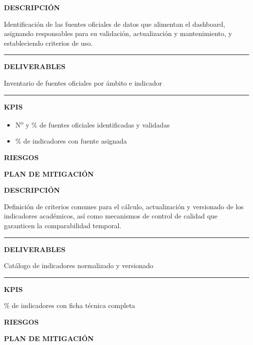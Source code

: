\documentclass[11pt,a4paper]{scrreprt}
\newcommand{\fieldlabel}[1]{%
  {\footnotesize\sffamily\bfseries\color{mutedcolor}\MakeUppercase{#1}}\par\nopagebreak[4]
}
\newcommand{\fieldsep}{\vspace{3pt}\noindent\textcolor{bordercolor}{\rule{\linewidth}{0.4pt}}\vspace{3pt}\par}
\begin{document}
\begin{tcolorbox}[pabox={dashcolor}{PA3.1 \enspace\textbullet\enspace Identificación y validación de fuentes oficiales de datos}]

\fieldlabel{Descripci\'on}
{\small Identificación de las fuentes oficiales de datos que alimentan el dashboard, asignando responsables para su validación, actualización y mantenimiento, y estableciendo criterios de uso.}\par
\fieldsep
\fieldlabel{Deliverables}
{\small Inventario de fuentes oficiales por ámbito e indicador}\par
\fieldsep
\fieldlabel{KPIs}
{\small \begin{itemize}[noitemsep,topsep=2pt]
\item N\textsuperscript{o} y \% de fuentes oficiales identificadas y validadas
\item \% de indicadores con fuente asignada
\end{itemize}}\par
\end{tcolorbox}
\begin{tcolorbox}[riskbox]
{\footnotesize\sffamily\bfseries\color{red!50!black} RIESGOS}\par{}
\end{tcolorbox}
\begin{tcolorbox}[mitbox]
{\footnotesize\sffamily\bfseries\color{green!40!black} PLAN DE MITIGACI\'ON}\par{}
\end{tcolorbox}
\vspace{8pt}

\begin{tcolorbox}[pabox={dashcolor}{PA3.2 \enspace\textbullet\enspace Normalización, versionado y control de indicadores académicos}]

\fieldlabel{Descripci\'on}
{\small Definición de criterios comunes para el cálculo, actualización y versionado de los indicadores académicos, así como mecanismos de control de calidad que garanticen la comparabilidad temporal.}\par
\fieldsep
\fieldlabel{Deliverables}
{\small Catálogo de indicadores normalizado y versionado}\par
\fieldsep
\fieldlabel{KPIs}
{\small \% de indicadores con ficha técnica completa}\par
\end{tcolorbox}
\begin{tcolorbox}[riskbox]
{\footnotesize\sffamily\bfseries\color{red!50!black} RIESGOS}\par{}
\end{tcolorbox}
\begin{tcolorbox}[mitbox]
{\footnotesize\sffamily\bfseries\color{green!40!black} PLAN DE MITIGACI\'ON}\par{}
\end{tcolorbox}
\vspace{8pt}
\end{document}
